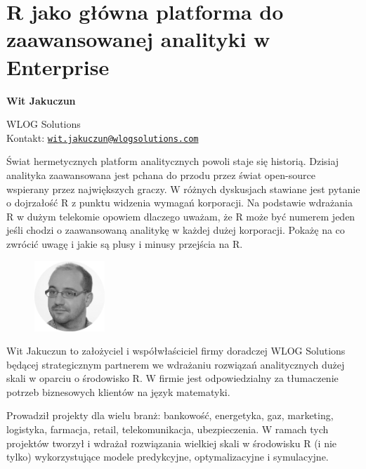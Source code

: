 \documentclass[\main/boa.tex]{subfiles}
\begin{document}
\section{R jako główna platforma do zaawansowanej analityki w Enterprise}


\begin{minipage}{0.915\textwidth}
	\centering
  {\bf \LARGE {} Wit Jakuczun}
\end{minipage}



\begin{affiliations}
\begin{minipage}{0.915\textwidth}
\centering
\large WLOG Solutions \\[1pt]
Kontakt: \href{mailto:wit.jakuczun@wlogsolutions.com}{\nolinkurl{wit.jakuczun@wlogsolutions.com}}\\
\end{minipage}
\end{affiliations}


Świat hermetycznych platform analitycznych powoli staje się historią. Dzisiaj analityka zaawansowana jest pchana do przodu przez świat open-source wspierany przez największych graczy. W różnych dyskusjach stawiane jest pytanie o dojrzałość R z punktu widzenia wymagań korporacji. Na podstawie wdrażania R w dużym telekomie opowiem dlaczego uważam, że R może być numerem jeden jeśli chodzi o zaawansowaną analitykę w każdej dużej korporacji. Pokażę na co zwrócić uwagę i jakie są plusy i minusy przejścia na R. 

\bio
\begin{figure}
    \includegraphics[width=100px]{img/guests/czarno_biale/wjakuczun.png}
\end{figure} 
Wit Jakuczun to założyciel i współwłaściciel firmy doradczej WLOG Solutions będącej strategicznym partnerem we wdrażaniu rozwiązań analitycznych dużej skali w oparciu o środowisko R. W firmie jest odpowiedzialny za tłumaczenie potrzeb biznesowych klientów na język matematyki.

Prowadził projekty dla wielu branż: bankowość, energetyka, gaz, marketing, logistyka, farmacja, retail, telekomunikacja, ubezpieczenia. W ramach tych projektów tworzył i wdrażał rozwiązania wielkiej skali w środowisku R (i nie tylko) wykorzystujące modele predykcyjne, optymalizacyjne i symulacyjne.
\end{document}
